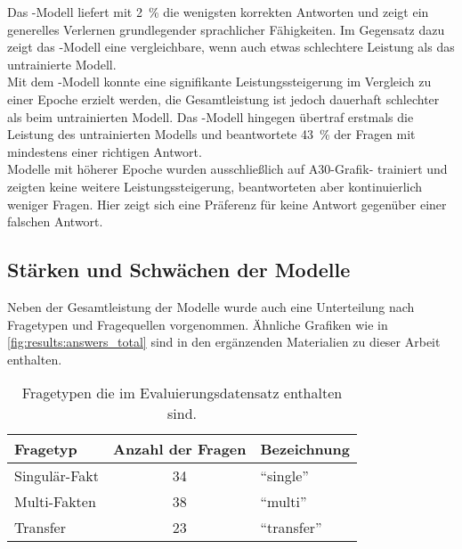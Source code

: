 Das \liv-Modell liefert mit \SI{2}{\percent} die wenigsten korrekten Antworten und zeigt ein generelles Verlernen grundlegender sprachlicher Fähigkeiten.
Im Gegensatz dazu zeigt das \lia-Modell eine vergleichbare, wenn auch etwas schlechtere Leistung als das untrainierte Modell.\\

Mit dem \lev-Modell konnte eine signifikante Leistungssteigerung im Vergleich zu einer Epoche erzielt werden, die Gesamtleistung ist jedoch dauerhaft schlechter als beim untrainierten Modell.
Das \lea-Modell hingegen übertraf erstmals die Leistung des untrainierten Modells und beantwortete \SI{43}{\percent} der Fragen mit mindestens einer richtigen Antwort.\\

Modelle mit höherer Epoche wurden ausschließlich auf A30-Grafik- trainiert und zeigten keine weitere Leistungssteigerung, beantworteten aber kontinuierlich weniger Fragen.
Hier zeigt sich eine Präferenz für keine Antwort gegenüber einer falschen Antwort.\\

\subsection{Stärken und Schwächen der Modelle}\label{subsec:results:correctness:strengths}
Neben der Gesamtleistung der Modelle wurde auch eine Unterteilung nach Fragetypen und Fragequellen vorgenommen.
Ähnliche Grafiken wie in \cref{fig:results:answers_total} sind in den ergänzenden Materialien zu dieser Arbeit enthalten.

\begin{table}
    \centering
    \begin{tabular}{lcl}
        \toprule
        \textbf{Fragetyp} & \textbf{Anzahl der Fragen} & \textbf{Bezeichnung} \\
        \midrule
        Singulär-Fakt     & 34                         & \enquote{single}     \\
        Multi-Fakten      & 38                         & \enquote{multi}      \\
        Transfer          & 23                         & \enquote{transfer}   \\
        \bottomrule
    \end{tabular}
    \caption[Fragetypen des Evaluierungsdatensatzes]{Fragetypen die im Evaluierungsdatensatz enthalten sind.}\label{tab:eval-question-types}
\end{table}


